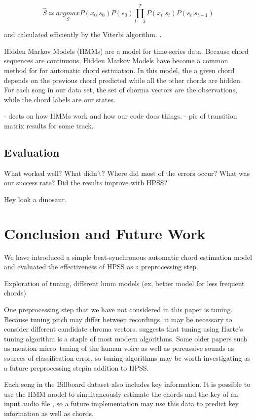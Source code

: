 \documentclass{article}
\begin{document}
$$\hat{S} \simeq  \underset{S}{argmax} P(x_{0}|s_{0}) P(s_{0}) \prod_{t=1}^{T} P(x_{t}|s_{t}) P(s_{t}|s_{t-1})$$

and calculated efficiently by the Viterbi algorithm. \cite{Ueda:01}.


Hidden Markov Models (HMMs) are a model for time-series data. Because chord sequences are continuous,  Hidden Markov Models have become a common method for for automatic chord estimation. In this model, the a given chord depends on the previous chord predicted while all the other chords are hidden. For each song in our data set, the set of chorma vectors are the observations, while the chord labels are our states. 

- deets on how HMMs work and how our code does things.
- pic of transition matrix results for some track.

\subsection{Evaluation}


What worked well? What didn't? Where did most of the errors occur?
What was our success rate? Did the results improve with HPSS?

Hey look a dinosaur.

\section{Conclusion and Future Work}

We have introduced a simple beat-synchronous automatic chord estimation model
and evaluated the effectiveness of HPSS as a preprocessing step.

Exploration of tuning, different hmm models (ex, better model for less frequent chords)

One preprocessing step that we have not considered in this paper is tuning. Because tuning pitch 
may differ between recordings, it may be necessary to consider different candidate chroma vectors. 
\cite{McVicar:00} suggests that tuning using Harte's tuning algorithm is a staple of most modern
algorithms. Some older papers such as \cite{Zenz:20} mention micro--tuning of the human voice as well 
as percussive sounds as sources of classification error, so tuning algorithms may be worth investigating 
as a future preprocessing stepin addition to HPSS. 

Each song in the Billboard dataset also includes key information. It is possible to use the HMM model to 
simultaneously estimate the chords and the key of an input audio file \cite{McVicar:00}, so a future
implementation may use this data to predict key information as well as chords.
\end{document}
